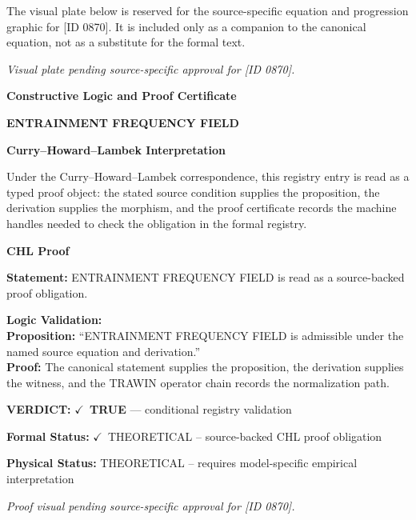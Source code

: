 \begingroup\footnotesize\sloppy
The visual plate below is reserved for the source-specific equation and progression graphic for [ID 0870]. It is included only as a companion to the canonical equation, not as a substitute for the formal text.
\par\endgroup
\begingroup\footnotesize\itshape
Visual plate pending source-specific approval for [ID 0870].
\par\endgroup

\clearpage
\begingroup\tzpsupportsetup
\noindent\textbf{\fontsize{10.8pt}{12.8pt}\selectfont [ID 0870] Constructive Logic and Proof Certificate}\par
\noindent\textbf{\fontsize{10pt}{12pt}\selectfont ENTRAINMENT FREQUENCY FIELD}\par
\vspace{0.45em}
\begingroup
\footnotesize
\setlength{\parskip}{0.22em}
\setlength{\parindent}{0pt}
\noindent\textbf{Curry--Howard--Lambek Interpretation}\par
Under the Curry--Howard--Lambek correspondence, this registry entry is read as a typed proof
object: the stated source condition supplies the proposition, the derivation supplies the
morphism, and the proof certificate records the machine handles needed to check the obligation
in the formal registry.

\vspace{0.45em}
\noindent\textbf{CHL Proof}\par
\textbf{Statement:} ENTRAINMENT FREQUENCY FIELD is read as a source-backed proof obligation.

\textbf{Logic Validation:}\\
\textbf{Proposition:} ``ENTRAINMENT FREQUENCY FIELD is admissible under the named source equation and derivation.''\\
\textbf{Proof:} The canonical statement supplies the proposition, the derivation supplies the witness, and the TRAWIN operator chain records the normalization path.

\textbf{VERDICT:} \ensuremath{\checkmark}\ \textbf{TRUE} --- conditional registry validation

\textbf{Formal Status:} \ensuremath{\checkmark}\ THEORETICAL -- source-backed CHL proof obligation

\textbf{Physical Status:} THEORETICAL -- requires model-specific empirical interpretation
\par\vspace{0.45em}
\par
\vfill
\begingroup\footnotesize\itshape
Proof visual pending source-specific approval for [ID 0870].
\par\endgroup
\vfill
\endgroup
\endgroup
